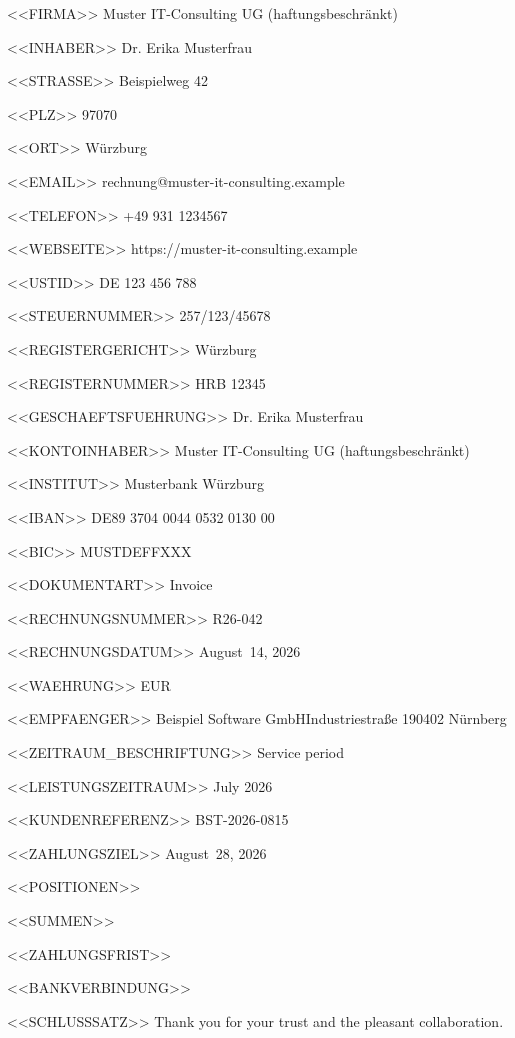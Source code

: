 <<FIRMA>>
Muster IT-Consulting UG (haftungsbeschränkt)

<<INHABER>>
Dr. Erika Musterfrau

<<STRASSE>>
Beispielweg 42

<<PLZ>>
97070

<<ORT>>
Würzburg

<<EMAIL>>
rechnung@muster-it-consulting.example

<<TELEFON>>
+49 931 1234567

<<WEBSEITE>>
https://muster-it-consulting.example

<<USTID>>
DE 123 456 788

<<STEUERNUMMER>>
257/123/45678

<<REGISTERGERICHT>>
Würzburg

<<REGISTERNUMMER>>
HRB 12345

<<GESCHAEFTSFUEHRUNG>>
Dr. Erika Musterfrau

<<KONTOINHABER>>
Muster IT-Consulting UG (haftungsbeschränkt)

<<INSTITUT>>
Musterbank Würzburg

<<IBAN>>
DE89 3704 0044 0532 0130 00

<<BIC>>
MUSTDEFFXXX

<<DOKUMENTART>>
Invoice

<<RECHNUNGSNUMMER>>
R26-042

<<RECHNUNGSDATUM>>
August~14, 2026

<<WAEHRUNG>>
EUR

<<EMPFAENGER>>
Beispiel Software GmbH\zeilenwechsel{}Industriestraße 1\zeilenwechsel{}90402 Nürnberg

<<ZEITRAUM_BESCHRIFTUNG>>
Service period

<<LEISTUNGSZEITRAUM>>
July 2026

<<KUNDENREFERENZ>>
BST-2026-0815

<<ZAHLUNGSZIEL>>
August~28, 2026

<<POSITIONEN>>
 \positionstrenner{}

<<SUMMEN>>
   \summentrenner{}

<<ZAHLUNGSFRIST>>

<<BANKVERBINDUNG>>
\bankblock{}

<<SCHLUSSSATZ>>
Thank you for your trust and the pleasant collaboration.
